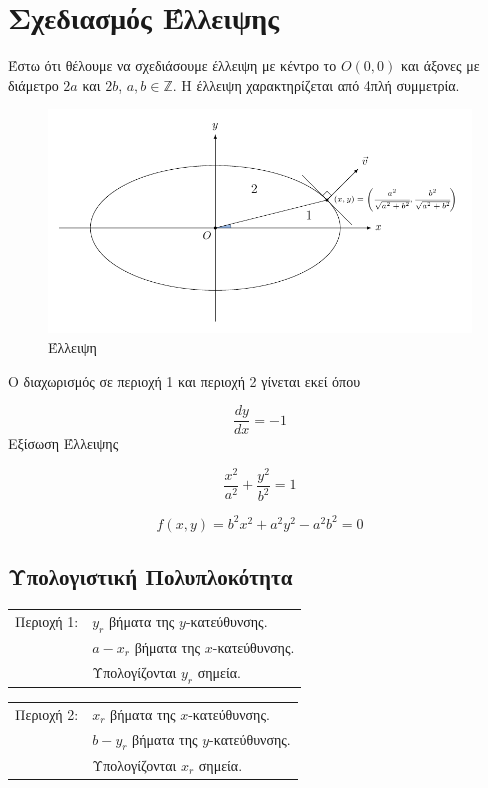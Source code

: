 \section{Σχεδιασμός Έλλειψης}

    Έστω ότι θέλουμε να σχεδιάσουμε έλλειψη με κέντρο το $O (0,0)$ και άξονες με διάμετρο $2a$ και $2b$, $a, b \in \mathbb{Z}$. Η έλλειψη χαρακτηρίζεται από 4πλή συμμετρία.

\begin{figure}[hbt]
  \begin{center}
	\includegraphics[scale=1]{Figures/Chapter1/Ellipse/figure1.pdf}
  \end{center}
  \caption{Έλλειψη}
\end{figure}

Ο διαχωρισμός σε περιοχή 1 και περιοχή 2 γίνεται εκεί όπου

\[
\frac{dy}{dx} = -1
\]
Εξίσωση Έλλειψης

\[
\frac{x^2}{a^2} + \frac{y^2}{b^2} = 1
\]

\[
f(x,y) = b^2x^2 + a^2y^2 - a^2b^2 = 0
\]
\subsection{Υπολογιστική Πολυπλοκότητα}

\begin{tabular}{m{}m{}}
	  Περιοχή 1: & \( y_r \) βήματα της \( y \)-κατεύθυνσης.\\
	& \( a - x_r \) βήματα της \( x \)-κατεύθυνσης.\\
	& Υπολογίζονται \( y_r \) σημεία.
\end{tabular}

\begin{tabular}{m{}m{}}
	Περιοχή 2: & \( x_r \) βήματα της \( x \)-κατεύθυνσης.\\
	& \( b - y_r \) βήματα της \( y \)-κατεύθυνσης.\\
	& Υπολογίζονται \( x_r \) σημεία.
\end{tabular}

